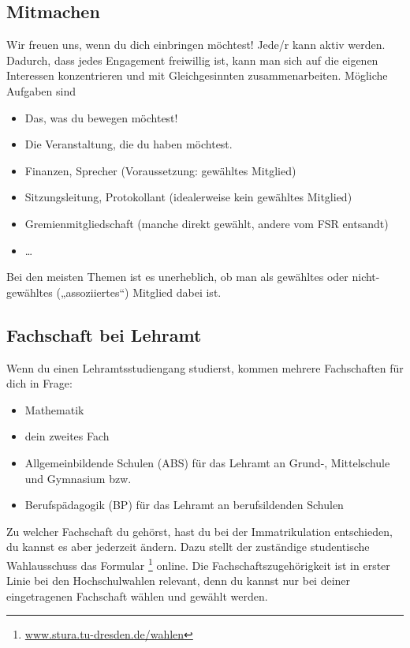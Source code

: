 \documentclass{scrartcl}
\begin{document}
\subsection*{Mitmachen}
\label{sub:mitmachen}
Wir freuen uns, wenn du dich einbringen möchtest! Jede/r kann aktiv werden.
Dadurch, dass jedes Engagement freiwillig ist, kann man sich auf die eigenen Interessen konzentrieren
und mit Gleichgesinnten zusammenarbeiten. Mögliche Aufgaben sind
\begin{itemize}
  \item Das, was du bewegen möchtest!
  \item Die Veranstaltung, die du haben möchtest.
  \item Finanzen, Sprecher (Voraussetzung: gewähltes Mitglied)
  \item Sitzungsleitung, Protokollant (idealerweise kein gewähltes Mitglied)
  \item Gremienmitgliedschaft (manche direkt gewählt, andere vom FSR entsandt)
  \item \dots
\end{itemize}
Bei den meisten Themen ist es unerheblich, ob man als gewähltes oder nicht-gewähltes („assoziiertes“) Mitglied dabei ist.

\subsection*{Fachschaft bei Lehramt}
\label{sub:fachschaft_bei_lehramt}
Wenn du einen Lehramtsstudiengang studierst, kommen mehrere Fachschaften für dich in Frage:
\begin{itemize}
  \item Mathematik
  \item dein zweites Fach
  \item Allgemeinbildende Schulen (ABS) für das Lehramt an Grund-, Mittelschule und Gymnasium bzw.
  \item Berufspädagogik (BP) für das Lehramt an berufsildenden Schulen 
\end{itemize}
Zu welcher Fachschaft du gehörst, hast du bei der Immatrikulation entschieden,
du kannst es aber jederzeit ändern.
Dazu stellt der zuständige studentische Wahlausschuss das Formular
\footnote{\url{www.stura.tu-dresden.de/wahlen}} online.
  Die Fachschaftszugehörigkeit ist in erster Linie bei den Hochschulwahlen relevant,
  denn du kannst nur bei deiner eingetragenen Fachschaft wählen und gewählt werden.
\end{document}
